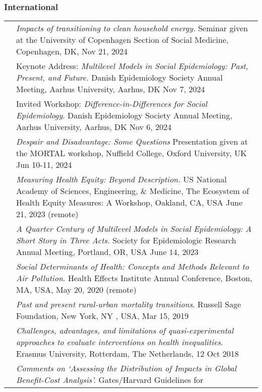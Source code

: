 \documentclass[
  letterpaper,
  DIV=11,
  numbers=noendperiod]{scrartcl}
\begin{document}
\subsubsection{International}\label{international-1}

\begin{longtable}[]{@{}
  >{\raggedright\arraybackslash}p{}
  >{\raggedright\arraybackslash}p{}@{}}
\toprule\noalign{}
\endhead
\bottomrule\noalign{}
\endlastfoot
2024 & \emph{Impacts of transitioning to clean household energy.}
Seminar given at the University of Copenhagen Section of Social
Medicine, Copenhagen, DK, Nov 21, 2024 \\
2024 & Keynote Address: \emph{Multilevel Models in Social Epidemiology:
Past, Present, and Future.} Danish Epidemiology Society Annual Meeting,
Aarhus University, Aarhus, DK Nov 7, 2024 \\
2024 & Invited Workshop: \emph{Difference-in-Differences for Social
Epidemiology}. Danish Epidemiology Society Annual Meeting, Aarhus
University, Aarhus, DK Nov 6, 2024 \\
2024 & \emph{Despair and Disadvantage: Some Questions} Presentation
given at the MORTAL workshop, Nuffield College, Oxford University, UK
Jun 10-11, 2024 \\
2023 & \emph{Measuring Health Equity: Beyond Description.} US National
Academy of Sciences, Engineering, \& Medicine, The Ecosystem of Health
Equity Measures: A Workshop, Oakland, CA, USA June 21, 2023 (remote) \\
2023 & \emph{A Quarter Century of Multilevel Models in Social
Epidemiology: A Short Story in Three Acts.} Society for Epidemiologic
Research Annual Meeting, Portland, OR, USA June 14, 2023 \\
2020 & \emph{Social Determinants of Health: Concepts and Methods
Relevant to Air Pollution}. Health Effects Institute Annual Conference,
Boston, MA, USA, May 20, 2020 (remote) \\
2019 & \emph{Past and present rural-urban mortality transitions}.
Russell Sage Foundation, New York, NY , USA, Mar 15, 2019 \\
2018 & \emph{Challenges, advantages, and limitations of
quasi-experimental approaches to evaluate interventions on health
inequalities}. Erasmus University, Rotterdam, The Netherlands, 12 Oct
2018 \\
2017 & \emph{Comments on `Assessing the Distribution of Impacts in
Global Benefit-Cost Analysis'.} Gates/Harvard Guidelines for

\end{longtable}
\end{document}
